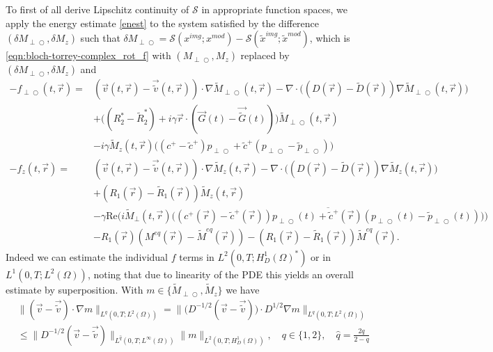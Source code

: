 \documentclass{ws-m3as}
\renewcommand\Re{\mathrm{Re}}
\def\Mpp{M_{\perp\!\!\!\!\!\bigcirc}}
\def\Mpptil{\tilde{M}_{\perp\!\!\!\!\!\bigcirc}}
\def\pp{p_{\perp\!\!\!\!\!\bigcirc}}
\def\pptil{\tilde{p}_{\perp\!\!\!\!\!\bigcirc}}
\def\fpp{f_{\perp\!\!\!\!\!\bigcirc}}
\begin{document}
To first of all derive Lipschitz continuity of  $\mathcal{S}$ in appropriate function spaces, we apply the energy estimate \eqref{enest} to the system satisfied by the difference 
$(\delta \Mpp,\delta M_z)$ such that $\delta \Mpp=\mathcal{S}(x^{img};x^{mod})-\mathcal{S}(\tilde{x}^{img};\tilde{x}^{mod})$, which is \eqref{eqn:bloch-torrey-complex_rot_f} with $(\Mpp,M_z)$ replaced by $(\delta \Mpp,\delta M_z)$ and
\begin{equation}\label{fdiff}
\begin{aligned}
-\fpp(t, \vec r) =& 
({\vec v}(t, \vec r)-\vec{\tilde{v}}(t, \vec r))\cdot\nabla \Mpptil(t, \vec r) -\nabla\cdot\bigl((D(\vec r)-\tilde{D}(\vec r)) \nabla \Mpptil(t, \vec r)\bigr)\\
&+\bigl((R_2^*-\tilde{R}_2^*)+i\gamma \vec r \cdot (\vec G(t)-\vec{\tilde{G}}(t))\bigr)\Mpptil(t, \vec r)\\
&-i\gamma \tilde{M}_z(t, \vec r)\bigl((c^+-\tilde{c}^+)\pp+\tilde{c}^+(\pp-\pptil)\bigr)\\
-f_z(t, \vec r)=&
({\vec v}(t, \vec r)-\vec{\tilde{v}}(t, \vec r))\cdot\nabla \tilde{M}_z(t, \vec r) -\nabla\cdot\bigl((D(\vec r)-\tilde{D}(\vec r)) \nabla \tilde{M}_z(t, \vec r)\bigr)\\ 
&+(R_1(\vec r)-\tilde{R}_1(\vec r))\tilde{M}_z(t, \vec r)\\
&-\gamma\Re\bigl(i\tilde{M}_\perp(t, \vec r)\overline{\bigl((c^+(\vec r)-\tilde{c}^+(\vec r))\pp(t)+\tilde{c}^+(\vec r)(\pp(t)-\pptil(t))\bigr)}\bigr)\\
&-R_1(\vec r)(M^{eq}(\vec r)-\tilde{M}^{eq}(\vec r))-(R_1(\vec r)-\tilde{R}_1(\vec r))\tilde{M}^{eq}(\vec r).
\end{aligned}
\end{equation}
Indeed we can estimate the individual $f$ terms in $L^2(0,T;H_D^1(\Omega)^*)$ or in $L^1(0,T;L^2(\Omega))$, noting that due to linearity of the PDE this yields an overall estimate by superposition.
With $m\in\{\Mpptil,\tilde{M}_z\}$ we have
\begin{equation}\label{estv}
\begin{aligned}
&\|({\vec v}-\vec{\tilde{v}})\cdot\nabla m\|_{L^q(0,T;L^2(\Omega))}
=\|\bigl(D^{-1/2}({\vec v}-\vec{\tilde{v}})\bigr)\cdot  D^{1/2}\nabla m\|_{L^q(0,T;L^2(\Omega))}\\
&\leq \|D^{-1/2}({\vec v}-\vec{\tilde{v}})\|_{L^{\hat{q}}(0,T;L^\infty(\Omega))} \|m\|_{L^2(0,T;H_D^1(\Omega))}, \quad q\in\{1,2\}, \quad\hat{q}= \frac{2q}{2-q}
\end{aligned}
\end{equation}
\end{document}
